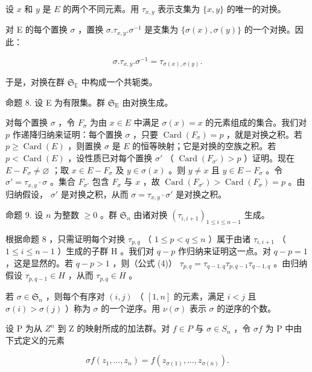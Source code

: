 设 \(x\) 和 \(y\) 是 \(E\) 的两个不同元素。用 \(\tau_{x,y}\) 表示支集为 \(\{x, y\}\) 的唯一的对换。

对 E 的每个置换 \(\sigma\) ，置换 \(\sigma. \tau_{x,y}. \sigma^{-1}\) 是支集为 \(\{\sigma(x), \sigma(y)\}\) 的一个对换。因此：

\[
\sigma . \tau_ {x, y}. \sigma^ {- 1} = \tau_ {\sigma (x), \sigma (y)}.\tag{4}
\]

于是，对换在群 \(\mathfrak{S}_{\mathbb{E}}\) 中构成一个共轭类。

命题 8. 设 E 为有限集。群 \(\mathfrak{S}_{\mathrm{E}}\) 由对换生成。

对每个置换 \(\sigma\) ，令 \(F_{\sigma}\) 为由 \(x \in E\) 中满足 \(\sigma(x) = x\) 的元素组成的集合。我们对 \(p\) 作递降归纳来证明：每个置换 \(\sigma\) ，只要 \(\operatorname{Card}(F_{\sigma}) = p\) ，就是对换之积。若 \(p \geqslant \operatorname{Card}(E)\) ，则置换 \(\sigma\) 是 \(E\) 的恒等映射；它是对换的空族之积。若 \(p < \operatorname{Card}(E)\) ，设性质已对每个置换 \(\sigma'\) （ \(\operatorname{Card}(F_{\sigma'}) > p\) ）证明。现在 \(E - F_{\sigma} \neq \varnothing\) ；取 \(x \in E - F_{\sigma}\) 及 \(y \in \sigma(x)\) 。则 \(y \neq x\) 且 \(y \in E - F_{\sigma}\) 。令 \(\sigma' = \tau_{x,y} \cdot \sigma\) 。集合 \(F_{\sigma'}\) 包含 \(F_{\sigma}\) 与 \(x\) ，故 \(\operatorname{Card}(F_{\sigma'}) > \operatorname{Card}(F_{\sigma}) = p\) 。由归纳假设， \(\sigma'\) 是对换之积，从而 \(\sigma = \tau_{x,y} \cdot \sigma'\) 是对换之积。

命题 9. 设 \(n\) 为整数 \(\geqslant 0\) 。群 \(\mathfrak{S}_n\) 由诸对换 \((\tau_{i,i+1})_{1\leqslant i\leqslant n-1}\) 生成。

根据命题 8 ，只需证明每个对换 \(\tau_{p,q}\) （ \(1 \leqslant p < q \leqslant n\) ）属于由诸 \(\tau_{i,i+1}\) （ \(1 \leqslant i \leqslant n-1\) ）生成的子群 H 。我们对 \(q-p\) 作归纳来证明这一点。对 \(q-p=1\) ，这是显然的。若 \(q-p>1\) ，则（公式 (4)） \(\tau_{p,q} = \tau_{q-1,q}\tau_{p,q-1}\tau_{q-1,q}\) 。由归纳假设 \(\tau_{p,q-1} \in H\) ，从而 \(\tau_{p,q} \in H\) 。

若 \(\sigma \in \mathfrak{S}_n\) ，则每个有序对 \((i,j)\) （ \([1,n]\) 的元素，满足 \(i < j\) 且 \(\sigma(i) > \sigma(j)\) ）称为 \(\sigma\) 的一个逆序。用 \(\nu(\sigma)\) 表示 \(\sigma\) 的逆序的个数。

设 P 为从 \(Z^{n}\) 到 Z 的映射所成的加法群。对 \(f \in P\) 与 \(\sigma \in S_{n}\) ，令 \(\sigma f\) 为 P 中由下式定义的元素

\[
\sigma f (z _ {1}, \dots , z _ {n}) = f (z _ {\sigma (1)}, \dots , z _ {\sigma (n)}).\tag{5}
\]

